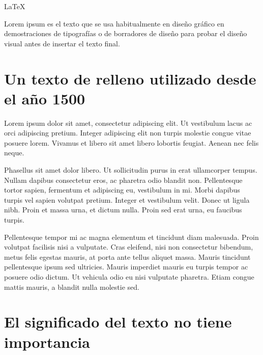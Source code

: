 \documentclass[11pt,a4paper]{article}
\begin{document}
\LaTeX

\tableofcontents

Lorem ipsum es el \textsf{texto que se usa habitualmente en diseño gráfico en demostraciones de tipografías o de borradores de diseño} \newline
para probar el diseño visual antes de insertar el texto final.



\section{Un texto de relleno utilizado desde el año 1500}


{\ttfamily
Lorem ipsum dolor sit amet, consectetur adipiscing elit. Ut vestibulum lacus ac orci adipiscing pretium. Integer adipiscing elit non turpis molestie congue vitae posuere lorem. Vivamus et libero sit amet libero lobortis feugiat. Aenean nec felis neque. }

Phasellus sit amet dolor libero. Ut sollicitudin purus in erat ullamcorper tempus. Nullam dapibus consectetur eros, ac pharetra odio blandit non. Pellentesque tortor sapien, fermentum et adipiscing eu, vestibulum in mi. Morbi dapibus turpis vel sapien volutpat pretium. Integer et vestibulum velit. Donec ut ligula nibh. Proin et massa urna, et dictum nulla. Proin sed erat urna, eu faucibus turpis. 

Pellentesque tempor mi ac magna elementum et tincidunt diam malesuada. Proin volutpat facilisis nisi a vulputate. Cras eleifend, nisi non consectetur bibendum, metus felis egestas mauris, at porta ante tellus aliquet massa. Mauris tincidunt pellentesque ipsum sed ultricies. Mauris imperdiet mauris eu turpis tempor ac posuere odio dictum. 
\newpage
Ut vehicula odio eu nisi vulputate pharetra. Etiam congue mattis mauris, a blandit nulla molestie sed.



\section{El significado del texto no tiene importancia}
\end{document}
